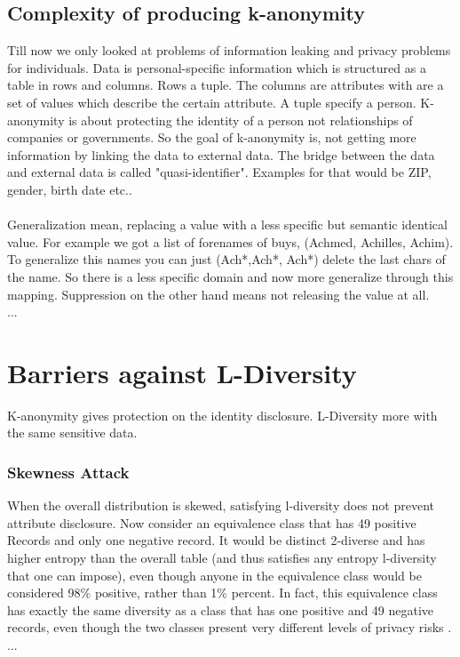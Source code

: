 \documentclass{llncs}
\begin{document}
\subsection{Complexity of producing k-anonymity}
Till now we only looked at problems of information leaking and privacy problems for individuals. Data is personal-specific information which is structured as a table in rows and columns. Rows a tuple. The columns are attributes with are a set of values which describe the certain attribute. A tuple specify a person. K-anonymity is about protecting the identity of a person not relationships of companies or governments. So the goal of k-anonymity is, not getting more information by linking the data to external data. The bridge between the data and external data is called "quasi-identifier". Examples for that would be ZIP, gender, birth date etc.. \\
\\
Generalization mean, replacing a value with a less specific but semantic identical value. For example we got a list of forenames of buys, (Achmed, Achilles, Achim). To generalize this names you can just (Ach*,Ach*, Ach*) delete the last chars of the name. So there is a less specific domain and now more generalize through this mapping. Suppression on the other hand means not releasing the value at all.
\\...
\section{Barriers against L-Diversity}

K-anonymity gives protection on the identity disclosure. L-Diversity more with the same sensitive data. 
\subsubsection{Skewness Attack} 
When the overall distribution is skewed, satisfying l-diversity does not prevent attribute disclosure.  Now consider an equivalence class that has 49 positive Records and only one negative record. It would be distinct 2-diverse and has higher entropy than the overall table (and thus satisfies any entropy l-diversity that one can impose), even though anyone in the equivalence class would be considered 98\% positive, rather than 1\% percent. In fact, this equivalence class has exactly the same diversity as a class that has one positive and 49 negative records, even though the two classes present very different levels of privacy risks \cite{ldiversity}. 
\\...
\end{document}
